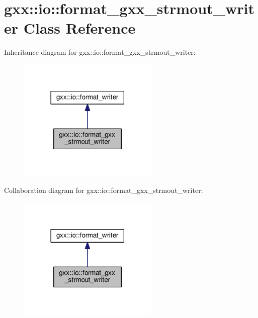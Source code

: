 \hypertarget{classgxx_1_1io_1_1format__gxx__strmout__writer}{}\section{gxx\+:\+:io\+:\+:format\+\_\+gxx\+\_\+strmout\+\_\+writer Class Reference}
\label{classgxx_1_1io_1_1format__gxx__strmout__writer}


Inheritance diagram for gxx\+:\+:io\+:\+:format\+\_\+gxx\+\_\+strmout\+\_\+writer\+:
\nopagebreak
\begin{figure}[H]
\begin{center}
\leavevmode
\includegraphics[width=189pt]{classgxx_1_1io_1_1format__gxx__strmout__writer__inherit__graph}
\end{center}
\end{figure}


Collaboration diagram for gxx\+:\+:io\+:\+:format\+\_\+gxx\+\_\+strmout\+\_\+writer\+:
\nopagebreak
\begin{figure}[H]
\begin{center}
\leavevmode
\includegraphics[width=189pt]{classgxx_1_1io_1_1format__gxx__strmout__writer__coll__graph}
\end{center}
\end{figure}
